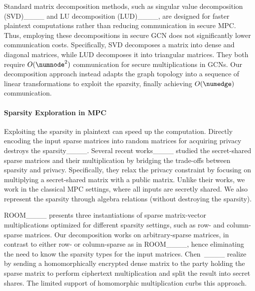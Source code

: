 Standard matrix decomposition methods, such as singular value decomposition (SVD)____ and LU decomposition (LUD)____, are designed for faster plaintext computations rather than reducing communication in secure MPC.
Thus, employing these decompositions in secure GCN does not significantly lower communication costs.
Specifically, SVD decomposes a matrix into dense and diagonal matrices, while LUD decomposes it into triangular matrices. 
They both require $O(\numnode^2)$ communication for secure multiplications in GCNs.
Our decomposition approach instead adapts the graph topology into a sequence of linear transformations to exploit the sparsity, finally achieving $O(\numedge)$ communication.

\paragraph{Sparsity Exploration in MPC} 
Exploiting the sparsity in plaintext can speed up the computation.
Directly encoding the input sparse matrices into random matrices for acquiring privacy destroys the %
sparsity____.
Several recent works____ studied the secret-shared sparse matrices and their multiplication by bridging the trade-offs between sparsity and privacy.
Specifically, they relax the privacy constraint by focusing on multiplying a secret-shared matrix with a public matrix.
Unlike their works, we work in the classical MPC settings, where all inputs are secretly shared. We also represent the sparsity through algebra relations (without destroying the sparsity).

ROOM____ presents three instantiations of sparse matrix-vector multiplications optimized for different sparsity settings, such as row- and column-sparse
matrices.
Our decomposition works on arbitrary-sparse matrices, in contrast to either row- or column-sparse as in ROOM____, hence eliminating the need to know the sparsity types for the input matrices.
Chen~\etal____ realize \osmm 
by sending a homomorphically encrypted dense matrix to the party holding the sparse matrix to perform ciphertext multiplication and split the result into secret shares.
The limited support of homomorphic multiplication curbs 
this approach.

